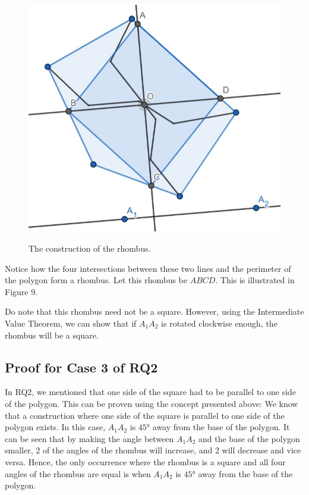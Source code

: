 \documentclass[12pt]{scrartcl}
\begin{document}
\begin{figure}[htpb]
	\centering
	\includegraphics[scale=.75]{images/rq3_1_4.jpg}
	\label{fig:rq3_1_4_img}
	\caption{The construction of the rhombus.}
\end{figure}

Notice how the four intersections between these two lines and the perimeter of the polygon form a rhombus. Let this rhombus be $ABCD$. This is illustrated in Figure 9.

\pagebreak

Do note that this rhombus need not be a square. However, using the Intermediate Value Theorem, we can show that if $A_{1}A_{2}$ is rotated clockwise enough, the rhombus will be a square.

\subsection{Proof for Case 3 of RQ2}
In RQ2, we mentioned that one side of the square had to be parallel to one side of the polygon. This can be proven using the concept presented above:
We know that a construction where one side of the square is parallel to one side of the polygon exists. In this case, $A_{1}A_{2}$ is $\ang{45}$ away from the base of the polygon. It can be seen that by making the angle between $A_{1}A_{2}$ and the base of the polygon smaller, 2 of the angles of the rhombus will increase, and 2 will decrease and vice versa.
Hence, the only occurrence where the rhombus is a square and all four angles of the rhombus are equal is when $A_{1}A_{2}$ is $\ang{45}$ away from the base of the polygon.
\end{document}
